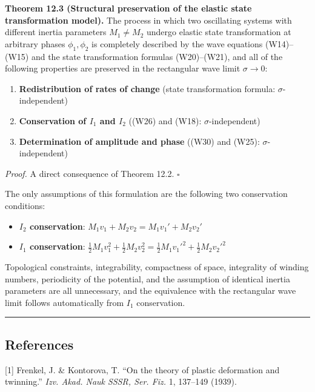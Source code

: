 \documentclass[a4paper,11pt]{article}
\providecommand{\tightlist}{\setlength{\itemsep}{0pt}\setlength{\parskip}{0pt}}
\begin{document}
\textbf{Theorem 12.3 (Structural preservation of the elastic state
transformation model).} The process in which two oscillating systems
with different inertia parameters \(M_1 \neq M_2\) undergo elastic state
transformation at arbitrary phases \(\phi_1, \phi_2\) is completely
described by the wave equations (W14)--(W15) and the state
transformation formulas (W20)--(W21), and all of the following
properties are preserved in the rectangular wave limit \(\sigma \to 0\):

\begin{enumerate}
\def\labelenumi{\arabic{enumi}.}
\tightlist
\item
  \textbf{Redistribution of rates of change} (state transformation
  formula: \(\sigma\)-independent)
\item
  \textbf{Conservation of \(I_1\) and \(I_2\)} ((W26) and (W18):
  \(\sigma\)-independent)
\item
  \textbf{Determination of amplitude and phase} ((W30) and (W25):
  \(\sigma\)-independent)
\end{enumerate}

\emph{Proof.} A direct consequence of Theorem 12.2. \(\square\)

The only assumptions of this formulation are the following two
conservation conditions:

\begin{itemize}
\tightlist
\item
  \textbf{\(I_2\) conservation}:
  \(M_1 v_1 + M_2 v_2 = M_1 v_1' + M_2 v_2'\)
\item
  \textbf{\(I_1\) conservation}:
  \(\frac{1}{2}M_1 v_1^2 + \frac{1}{2}M_2 v_2^2 = \frac{1}{2}M_1 v_1'^2 + \frac{1}{2}M_2 v_2'^2\)
\end{itemize}

Topological constraints, integrability, compactness of space,
integrality of winding numbers, periodicity of the potential, and the
assumption of identical inertia parameters are all unnecessary, and the
equivalence with the rectangular wave limit follows automatically from
\(I_1\) conservation.

\begin{center}\rule{0.5\linewidth}{0.5pt}\end{center}

\subsection{References}\label{references}

{[}1{]} Frenkel, J. \& Kontorova, T. ``On the theory of plastic
deformation and twinning.'' \emph{Izv. Akad. Nauk SSSR, Ser. Fiz.} 1,
137--149 (1939).
\end{document}
